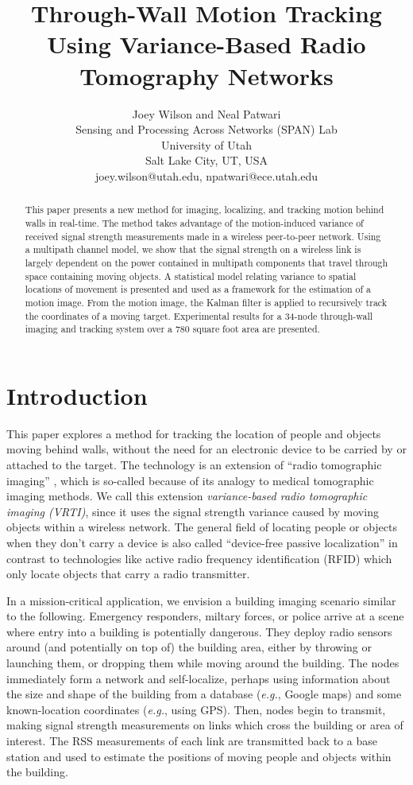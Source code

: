 \documentclass[journal]{IEEEtran}
\title{Through-Wall Motion Tracking Using Variance-Based Radio Tomography Networks}
\author{Joey Wilson and Neal Patwari\\
Sensing and Processing Across Networks (SPAN) Lab\\
University of Utah\\
Salt Lake City, UT, USA\\
joey.wilson@utah.edu,  npatwari@ece.utah.edu}
\newcommand{\eg}{{\it e.g.}}
\begin{document}
\maketitle

\begin{abstract}
This paper presents a new method for imaging, localizing, and tracking motion behind walls in real-time. The method takes advantage of the motion-induced variance of received signal strength measurements made in a wireless peer-to-peer network. Using a multipath channel model, we show that the signal strength on a wireless link is largely dependent on the power contained in multipath components that travel through space containing moving objects. A statistical model relating variance to spatial locations of movement is presented and used as a framework for the estimation of a motion image. From the motion image, the Kalman filter is applied to recursively track the coordinates of a moving target. Experimental results for a 34-node through-wall imaging and tracking system over a 780 square foot area are presented.
\end{abstract}



\section{Introduction}

This paper explores a method for tracking the location of people and objects moving behind walls, without the need for an electronic device to be carried by or attached to the target. The technology is an extension of ``radio tomographic imaging'' \cite{Wilson09a}, which is so-called because of its analogy to medical tomographic imaging methods.  We call this extension \textit{variance-based radio tomographic imaging (VRTI)}, since it uses the signal strength variance caused by moving objects within a wireless network.  The general field of locating people or objects when they don't carry a device is also called ``device-free passive localization'' \cite{Youssef07} in contrast to technologies like active radio frequency identification (RFID) which only locate objects that carry a radio transmitter.

In a mission-critical application, we envision a building imaging scenario similar to the following.  Emergency responders, miltary forces, or police arrive at a scene where entry into a building is potentially dangerous.  They deploy radio sensors around (and potentially on top of) the building area, either by throwing or launching them, or dropping them while moving around the building.  The nodes immediately form a network and self-localize, perhaps using information about the size and shape of the building from a database (\eg, Google maps) and some known-location coordinates (\eg, using GPS).  Then, nodes begin to transmit, making signal strength measurements on links which cross the building or area of interest.  The RSS measurements of each link are transmitted back to a base station and used to estimate the positions of moving people and objects within the building.
\end{document}
